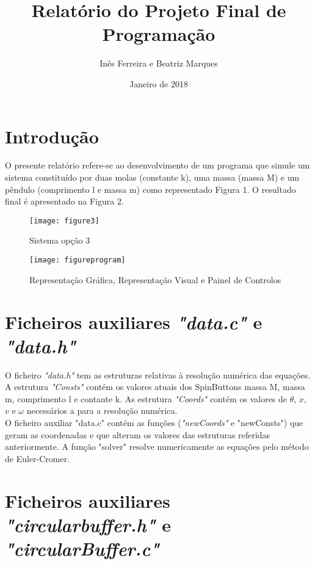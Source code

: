 \documentclass[11pt]{article}
\begin{document}
\title{Relat\'orio do Projeto Final de Programa\c{c}\~ao}
\date{Janeiro de 2018}
\author{In\^es Ferreira e Beatriz Marques}
\maketitle

\section*{Introdu\c{c}\~ao}

{
O presente relat\'orio refere-se ao desenvolvimento de um programa que simule um sistema constitu\'{i}do por duas molas (constante k), uma massa (massa M) e um p\^endulo (comprimento l e massa m) como representado Figura 1. O resultado 
final \'e apresentado na Figura 2.
}

\begin{figure}[ht]
    \centering
    \texttt{[image: figure3]}
    \caption{Sistema op\c{c}\~ao 3}
\end{figure}

\begin{figure}[ht] \label{fig2}
    \centering
    \texttt{[image: figureprogram]}
    \caption{Representa\c{c}\~ao Gr\'afica, Representa\c{c}\~ao Visual e Painel de Controlos }
\end{figure}

\section{Ficheiros auxiliares \textit{"data.c"} e \textit{"data.h"}}

{
O ficheiro \textit{"data.h"} tem as estruturas relativas \`{a} resolu\c{c}\~ao num\'erica das equa\c{c}\~oes. A estrutura \textit{"Consts"} cont\'em os valores atuais dos SpinButtons massa M, massa m, comprimento l e contante k. As estrutura \textit{"Coords"} cont\'em os valores de $\theta$, $x$, $v$ e $\omega$ necess\'arios a para a resolu\c{c}\~ao num\'erica.
\\
\indent
O ficheiro auxiliar "data.c" cont\'em as fun\c{c}\~oes (\textit{"newCoords"} e "newConsts") que geram as coordenadas e que alteram os valores das estruturas referidas anteriormente. A fun\c{c}\~ao "solver" resolve numericamente as equa\c{c}\~oes pelo m\'etodo de Euler-Cromer.
}

\section{Ficheiros auxiliares \textit{"circularbuffer.h"} e \textit{"circularBuffer.c"}}
\end{document}
